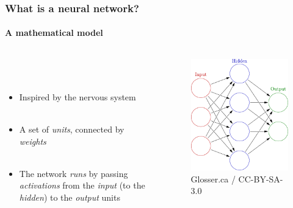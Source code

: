 \documentclass{beamer}
\newcommand{\figheight}{0.72\textheight}
\begin{document}
\begin{frame}
\frametitle{What is a neural network?}
\framesubtitle{A mathematical model}
 \begin{columns}[T]
    \begin{column}{.45\textwidth} 
     \ \\ 
     \ \\
\begin{itemize}[<+->]
\item Inspired by the nervous system \\ \
 \item A set of \emph{units}, connected by \emph{weights} \\ \
\item The network \emph{runs} by passing \emph{activations} from the \emph{input} (to the \emph{hidden}) to the \emph{output} units \\ \
\end{itemize}
\end{column}
\begin{column}{.55\textwidth}
\begin{figure}[t]
 \begin{flushleft}

 \includegraphics[height = \figheight]{./fig/3-layer.pdf}
 \end{flushleft}
 \caption{Glosser.ca / CC-BY-SA-3.0}
\end{figure}
\end{column}

\end{columns}
\end{frame}
\end{document}
